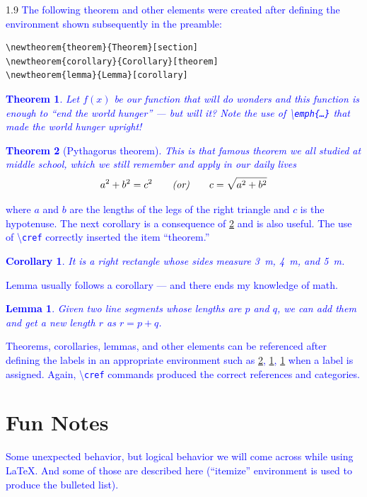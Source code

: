 \documentclass[phd]{ndsu-thesis-2022}
\newtheorem{theorem}{Theorem}[section]
\newtheorem{corollary}{Corollary}[theorem]
\newtheorem{lemma}{Lemma}[corollary]
\newcommand\myspacing{1.9}      %
\newcommand\italk[1]{\textcolor{blue}{#1}}  %
\newcommand\cmd[1]{\textbackslash\texttt{#1}}  %
\begin{document}
\begin{spacing}{\myspacing}
\italk{The following theorem and other elements were created after defining the environment shown subsequently in the preamble:}

\begin{verbatim}
\newtheorem{theorem}{Theorem}[section]
\newtheorem{corollary}{Corollary}[theorem]
\newtheorem{lemma}{Lemma}[corollary]
\end{verbatim}

\vspace{-0.5in}
\italk{
\begin{theorem}
Let \(f(x)\) be our function that will do wonders and this function is enough to \emph{``end the world hunger''} --- but will it? Note the use of \cmd{emph\{\ldots\}} that made the world hunger upright!
\end{theorem}
\begin{theorem}[Pythagorus theorem]
\label{pytha}
This is that famous theorem we all studied at middle school, which we still remember and apply in our daily lives 
\vspace{6ex} 
\[ a^2 + b^2 = c^2  \qquad \emph{(or)} \qquad c = \sqrt{a^2 + b^2} \] 
\end{theorem}
\vspace{-3ex} 
\noindent where $a$ and $b$ are the lengths of the legs of the right triangle and $c$ is the hypotenuse. 
The next corollary is a consequence of \cref{pytha} and is also useful. The use of \cmd{cref} correctly inserted the item ``theorem.''
\begin{corollary}
It is a right rectangle whose sides measure \SI{3}{m}, \SI{4}{m}, and \SI{5}{m}.
\label{coro}
\end{corollary}
Lemma usually follows a corollary --- and there ends my knowledge of math.
\begin{lemma}
Given two line segments whose lengths are $p$ and $q$, we can add them and get a new length $r$ as \(r=p+q\).
\label{lem}
\end{lemma}
Theorems, corollaries, lemmas, and other elements can be referenced after defining the labels in an appropriate environment such as \cref{pytha}, \cref{coro}, \cref{lem} when a label is assigned. Again, \cmd{cref} commands produced the correct references and categories. 
}

\section{Fun Notes}
\italk{Some unexpected behavior, but logical behavior we will come across while using \LaTeX. And some of those are described here (``itemize'' environment is used to produce the bulleted list).}


\end{spacing}
\end{document}
